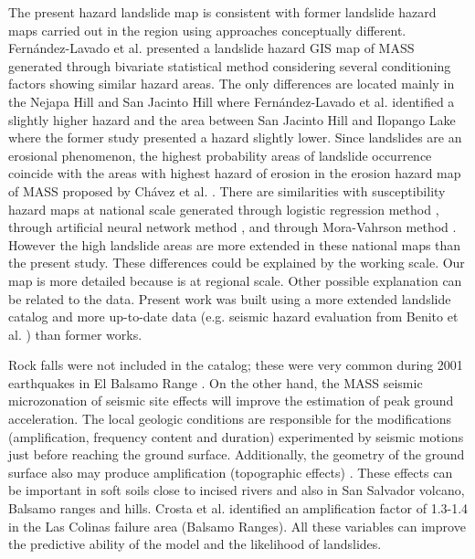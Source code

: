 \documentclass[11pt,twoside]{rmta2010eng}%
\begin{document}
The present hazard landslide map is consistent with former landslide hazard maps carried out in the region using approaches conceptually different. Fern\'{a}ndez-Lavado et al.\cite{fernan2008} presented a landslide hazard GIS map of MASS generated through bivariate statistical method considering several conditioning factors showing similar hazard areas. The only differences are located mainly in the Nejapa Hill and San Jacinto Hill where Fern\'{a}ndez-Lavado et al. \cite{fernan2008} identified a slightly higher hazard and the area between San Jacinto Hill and Ilopango Lake where the former study presented a hazard slightly lower. Since landslides are an erosional phenomenon, the highest probability areas of landslide occurrence coincide with the areas with highest hazard of erosion in the erosion hazard map of MASS proposed by Ch\'{a}vez et al. \cite{chavez2014a}. There are similarities with susceptibility hazard maps at national scale generated through logistic regression method \cite{garcia2008}, through artificial neural network method \cite{garcia2010}, and through Mora-Vahrson method \cite{snet2004}. However the high landslide areas are more extended in these national maps than the present study. These differences could be explained by the working scale. Our map is more detailed because is at regional scale. Other possible explanation can be related to the data. Present work was built using a more extended landslide catalog and more up-to-date data (e.g. seismic hazard evaluation from Benito et al. \cite{beni2012}) than former works.

Rock falls were not included in the catalog; these were very common during 2001 earthquakes in El Balsamo Range \cite{jibson}. On the other hand, the MASS seismic microzonation of seismic site effects will improve the estimation of peak ground acceleration. The local geologic conditions are responsible for the modifications (amplification, frequency content and duration) experimented by seismic motions just before reaching the ground surface. Additionally, the geometry of the ground surface also may produce amplification (topographic effects) \cite{aki1993}. These effects can be important in soft soils close to incised rivers and also in San Salvador volcano, Balsamo ranges and hills. Crosta et al. \cite{crosta2005} identified an amplification factor of 1.3-1.4 in the Las Colinas failure area (Balsamo Ranges). All these variables can improve the predictive ability of the model and the likelihood of landslides.
\end{document}

